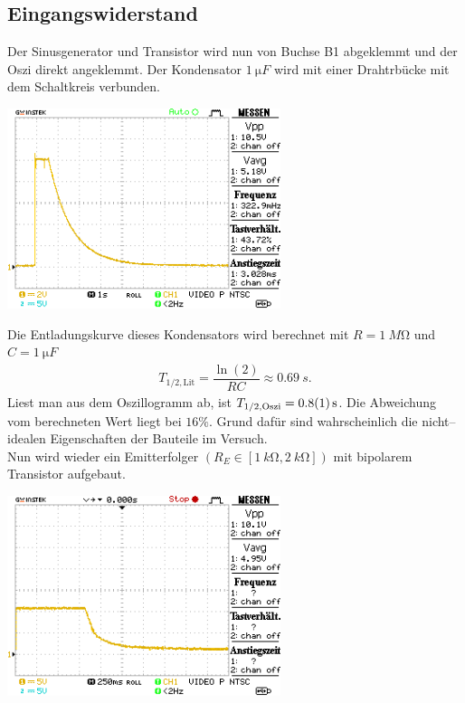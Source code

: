 \documentclass[10pt]{article}
\newenvironment{Figure}
  {\par\medskip\noindent\minipage{\linewidth}}
  {\endminipage\par\medskip}
\begin{document}
\begin{multicols}{2}
	\subsection{Eingangswiderstand}
	Der Sinusgenerator und Transistor wird nun von Buchse B1 abgeklemmt und der Oszi direkt angeklemmt.
	Der Kondensator $\SI{1}{\micro F}$ wird mit einer Drahtrbücke mit dem Schaltkreis verbunden.
	\begin{Figure}
		\centering
		\includegraphics[width=0.6\textwidth]{../data/DS0015.png}
	\end{Figure}
	Die Entladungskurve dieses Kondensators wird berechnet mit $R=\SI{1}{M\ohm}$ und $C=\SI{1}{\micro F}$
	\begin{align}
		T_{1/2,\text{Lit}}=\dfrac{\ln\left(2\right)}{RC}\approx \SI{0.69}{s}
		.\end{align}
	Liest man aus dem Oszillogramm ab, ist $T_{1/2,\text{Oszi}}=\SI{0.8+-0.1}{s}$.
	Die Abweichung vom berechneten Wert liegt bei $16\%$.
	Grund dafür sind wahrscheinlich die nicht--idealen Eigenschaften der Bauteile im Versuch.
	\\\indent Nun wird wieder ein Emitterfolger $\left(R_E \in \left[\SI{1}{k\ohm},\SI{2}{k\ohm}\right]\right)$ mit bipolarem Transistor aufgebaut.
	\begin{Figure}
		\centering
		\includegraphics[width=0.6\textwidth]{../data/DS0017.png}

\end{Figure}
\end{multicols}
\end{document}
